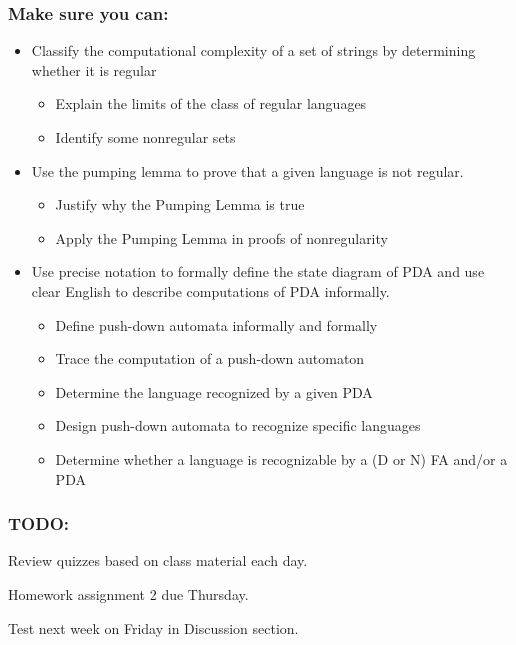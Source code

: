 \subsubsection*{Make sure you can:}
\begin{itemize}
\item Classify the computational complexity of a set of strings by determining whether it is regular
    \begin{itemize}
        \item Explain the limits of the class of regular languages
        \item Identify some nonregular sets
    \end{itemize}
\item Use the pumping lemma to prove that a given language is not regular.
    \begin{itemize}
        \item Justify why the Pumping Lemma is true
        \item Apply the Pumping Lemma in proofs of nonregularity    
    \end{itemize}
\item Use precise notation to formally define the state diagram of PDA and 
use clear English to describe computations of PDA informally.
\begin{itemize}
    \item Define push-down automata informally and formally
    \item Trace the computation of a push-down automaton
    \item Determine the language recognized by a given PDA
    \item Design push-down automata to recognize specific languages
    \item Determine whether a language is recognizable by a (D or N) FA and/or a PDA
\end{itemize}

\end{itemize}

\subsubsection*{TODO:}
\begin{list}
   {\itemsep2pt}
   \item Review quizzes based on class material each day.
   \item Homework assignment 2 due Thursday.
   \item Test next week on Friday in Discussion section.
\end{list}

